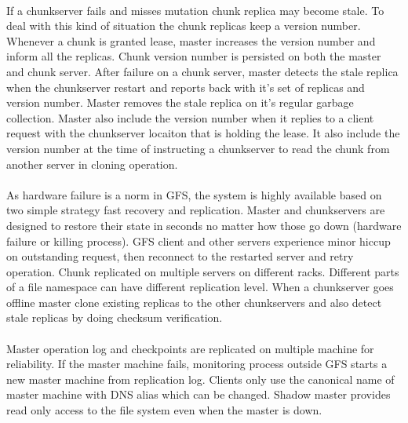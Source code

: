 \documentclass[8pt]{extarticle}
\begin{document}
	\paragraph{}
	If a chunkserver fails and misses mutation chunk replica may become stale. To deal with this kind of situation the chunk replicas keep a version number. Whenever a chunk is granted lease, master increases the version number and inform all the replicas. Chunk version number is persisted on both the master and chunk server. After failure on a chunk server, master detects the stale replica when the chunkserver restart and reports back with it's set of replicas and version number. Master removes the stale replica on it's regular garbage collection. Master also include the version number when it replies to a client request with the chunkserver locaiton that is holding the lease. It also include the version number at the time of instructing a chunkserver to read the chunk from another server in cloning operation.
	
	\paragraph{}
	As hardware failure is a norm in GFS, the system is highly available based on two simple strategy fast recovery and replication. Master and chunkservers are designed to restore their state in seconds no matter how those go down (hardware failure or killing process). GFS client and other servers experience minor hiccup on outstanding request, then reconnect to the restarted server and retry operation. Chunk replicated on multiple servers on different racks. Different parts of a file namespace can have different replication level. When a chunkserver goes offline master clone existing replicas to the other chunkservers and also detect stale replicas by doing checksum verification.
	
	\paragraph{}
	Master operation log and checkpoints are replicated on multiple machine for reliability. If the master machine fails, monitoring process outside GFS starts a new master machine from replication log. Clients only use the canonical name of master machine with DNS alias which can be changed. Shadow master provides read only access to the file system even when the master is down.
	
\end{document}
